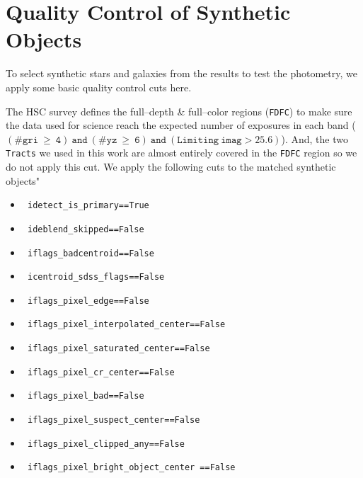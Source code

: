 \documentclass[useamsfonts]{pasj01}
\def\tracts{\texttt{Tracts}}
\begin{document}


\appendix
\section{Quality Control of Synthetic Objects}
    \label{app:qc}
    
    To select synthetic stars and galaxies from the results to test the photometry, 
    we apply some basic quality control cuts here. 
    
    The HSC survey defines the full--depth \& full--color regions (\texttt{FDFC}) to 
    make sure the data used for science reach the expected number of exposures in each 
    band 
    ($\mathtt{(\#gri\ \geq\ 4)\ and\ (\#yz\ \geq\ 6)\ and\ (Limiting\ imag> 25.6)}$). 
    And, the two \tracts{} we used in this work are almost entirely covered in 
    the \texttt{FDFC} region so we do not apply this cut.  
    We apply the following cuts to the matched synthetic objects" 

    \begin{itemize}
    
        \item[ ] \texttt{ idetect\_is\_primary==True }
        \item[ ] \texttt{ ideblend\_skipped==False }
        \item[ ] \texttt{ iflags\_badcentroid==False }
        \item[ ] \texttt{ icentroid\_sdss\_flags==False }
        \item[ ] \texttt{ iflags\_pixel\_edge==False }
        \item[ ] \texttt{ iflags\_pixel\_interpolated\_center==False }
        \item[ ] \texttt{ iflags\_pixel\_saturated\_center==False }
        \item[ ] \texttt{ iflags\_pixel\_cr\_center==False }
        \item[ ] \texttt{ iflags\_pixel\_bad==False }
        \item[ ] \texttt{ iflags\_pixel\_suspect\_center==False }
        \item[ ] \texttt{ iflags\_pixel\_clipped\_any==False }
        \item[ ] \texttt{ iflags\_pixel\_bright\_object\_center ==False }
        
    \end{itemize}
    
\end{document}
